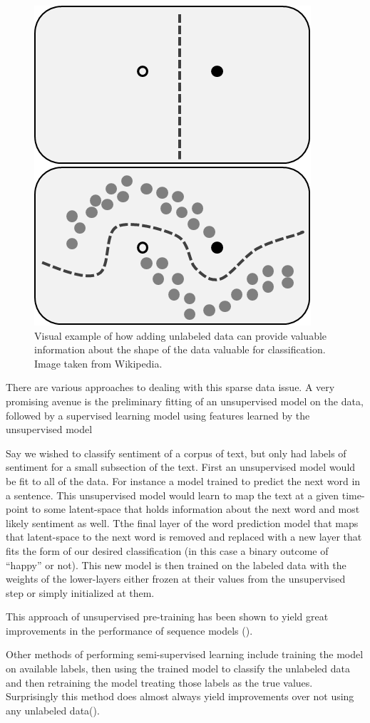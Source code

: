 \documentclass[]{book}
\theoremstyle{definition}
\theoremstyle{definition}
\theoremstyle{definition}
\theoremstyle{remark}
\begin{document}
\begin{figure}

{\centering \includegraphics[width=0.4\linewidth]{figures/semi-supervised} 

}

\caption{Visual example of how adding unlabeled data can provide valuable information about the shape of the data valuable for classification. Image taken from Wikipedia.}\label{fig:semisupervised}
\end{figure}

There are various approaches to dealing with this sparse data issue. A
very promising avenue is the preliminary fitting of an unsupervised
model on the data, followed by a supervised learning model using
features learned by the unsupervised model

Say we wished to classify sentiment of a corpus of text, but only had
labels of sentiment for a small subsection of the text. First an
unsupervised model would be fit to all of the data. For instance a model
trained to predict the next word in a sentence. This unsupervised model
would learn to map the text at a given time-point to some latent-space
that holds information about the next word and most likely sentiment as
well. Tthe final layer of the word prediction model that maps that
latent-space to the next word is removed and replaced with a new layer
that fits the form of our desired classification (in this case a binary
outcome of ``happy'' or not). This new model is then trained on the
labeled data with the weights of the lower-layers either frozen at their
values from the unsupervised step or simply initialized at them.

This approach of unsupervised pre-training has been shown to yield great
improvements in the performance of sequence models
(\citet{semi_supervised}).

Other methods of performing semi-supervised learning include training
the model on available labels, then using the trained model to classify
the unlabeled data and then retraining the model treating those labels
as the true values. Surprisingly this method does almost always yield
improvements over not using any unlabeled data(\citet{semi_supervised}).
\end{document}

